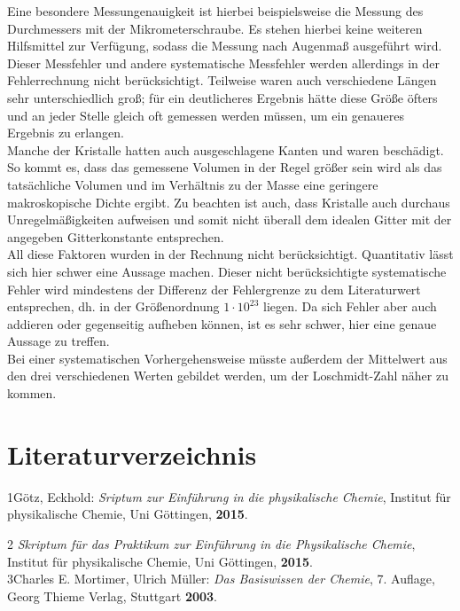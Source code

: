\documentclass[12pt,a4paper,titlepage,headinclude,bibtotoc]{scrartcl}
\begin{document}
Eine besondere Messungenauigkeit ist hierbei beispielsweise die Messung des Durchmessers mit der Mikrometerschraube. Es stehen hierbei keine weiteren Hilfsmittel zur Verfügung, sodass die Messung nach Augenmaß ausgeführt wird. Dieser Messfehler und andere systematische Messfehler werden allerdings in der Fehlerrechnung nicht berücksichtigt. Teilweise waren auch verschiedene Längen sehr unterschiedlich groß; für ein deutlicheres Ergebnis hätte diese Größe öfters und an jeder Stelle gleich oft gemessen werden müssen, um ein genaueres Ergebnis zu erlangen. \\

Manche der Kristalle hatten auch ausgeschlagene Kanten und waren beschädigt. So kommt es, dass das gemessene Volumen in der Regel größer sein wird als das tatsächliche Volumen und im Verhältnis zu der Masse eine geringere makroskopische Dichte ergibt. Zu beachten ist auch, dass Kristalle auch durchaus Unregelmäßigkeiten aufweisen und somit nicht überall dem idealen Gitter mit der angegeben Gitterkonstante entsprechen.\\


All diese Faktoren wurden in der Rechnung nicht berücksichtigt. Quantitativ lässt sich hier schwer eine Aussage machen. Dieser nicht berücksichtigte systematische Fehler wird mindestens der Differenz der Fehlergrenze zu dem Literaturwert entsprechen, dh. in der Größenordnung $1 \cdot 10^{23}$ liegen. Da sich Fehler aber auch addieren oder gegenseitig aufheben können, ist es sehr schwer, hier eine genaue Aussage zu treffen.\\

Bei einer systematischen Vorhergehensweise müsste außerdem der Mittelwert aus den drei verschiedenen Werten gebildet werden, um der Loschmidt-Zahl näher zu kommen.\\

\newpage

\section{Literaturverzeichnis}
1\quad Götz, Eckhold: \emph{Sriptum zur Einführung in die physikalische Chemie}, Institut für physikalische Chemie, Uni Göttingen, \textbf{2015}.

\vspace{0,5 cm}

2 \quad \emph{Skriptum für das Praktikum zur Einführung in die Physikalische Chemie}, Institut für physikalische Chemie, Uni Göttingen, \textbf{2015}.\\

3\quad Charles E. Mortimer, Ulrich Müller: \emph{Das Basiswissen der Chemie}, 7. Auflage, Georg Thieme Verlag, Stuttgart \textbf{2003}.
\end{document}
